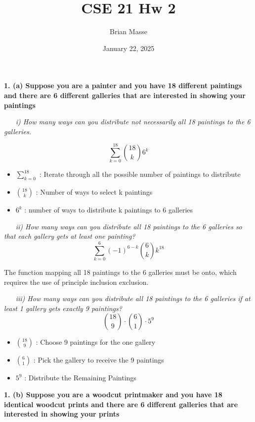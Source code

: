 \documentclass[12pt, letterpaper]{article}
\title{CSE 21 Hw 2}
\author{Brian Masse}
\date{January 22, 2025}
\begin{document}
\maketitle
\newpage

\bf{ 1. (a) Suppose you are a painter and you have 18 different paintings and there are 6 different galleries
that are interested in showing your paintings }

\-\ \newline
\-\ \it{ i) How many ways can you distribute not necessarily all 18 paintings to the 6 galleries. }

\[ \sum_{k=0}^{18} {18 \choose k}6^{k} \]

\begin{itemize}
    \item \(\sum_{k=0}^{18}\) : Iterate through all the possible number of paintings to distribute
    \item \({18 \choose k}\) : Number of ways to select k paintings
    \item \(6^{k}\) : number of ways to distribute k paintings to 6 galleries
\end{itemize} 

\-\ \newline
\-\ \it{ ii) How many ways can you distribute all 18 paintings to the 6 galleries so that each gallery gets
at least one painting?  }
\[ \sum_{k=0}^{6}(-1)^{6-k} {6 \choose k} k^{18}\]


\textnormal{The function mapping all 18 paintings to the 6 galleries must be onto, which requires the use of principle inclusion exclusion. }


\-\ \newline
\-\ \it{ iii) How many ways can you distribute all 18 paintings to the 6 galleries if at least 1 gallery gets
exactly 9 paintings? } 
\[ {18 \choose 9} \cdot {6 \choose 1} \cdot 5^{9}  \]

\begin{itemize}
    \item \({18 \choose 9}\) : Choose 9 paintings for the one gallery
    \item \({6 \choose 1}\) : Pick the gallery to receive the 9 paintings
    \item \(5^{9}\) : Distribute the Remaining Paintings
\end{itemize} 

\bf{ 1. (b) Suppose you are a woodcut printmaker and you have 18 identical woodcut prints and there are 6
different galleries that are interested in showing your prints }
\end{document}
